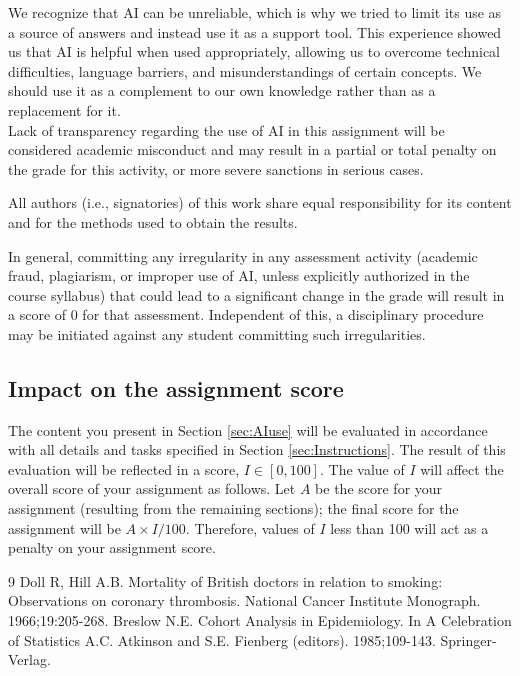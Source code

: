 \documentclass[10pt,a4paper,twoside]{article}\usepackage[]{graphicx}\usepackage[]{xcolor}
\begin{document}
We recognize that AI can be unreliable, which is why we tried to limit its use as a source of answers and instead use it as a support tool. This experience showed us that AI is helpful when used appropriately, allowing us to overcome technical difficulties, language barriers, and misunderstandings of certain concepts. We should use it as a complement to our own knowledge rather than as a replacement for it.
\[
\]
Lack of transparency regarding the use of AI in this assignment will be considered academic misconduct and may result in a partial or total penalty on the grade for this activity, or more severe sanctions in serious cases.

All authors (i.e., signatories) of this work share equal responsibility for its content and for the methods used to obtain the results. 

In general, committing any irregularity in any assessment activity (academic fraud, plagiarism, or improper use of AI, unless explicitly authorized in the course syllabus) that could lead to a significant change in the grade will result in a score of 0 for that assessment. Independent of this, a disciplinary procedure may be initiated against any student committing such irregularities.

\subsection{Impact on the assignment score}
The content you present in Section \ref{sec:AIuse} will be evaluated in accordance with all details and tasks specified in Section \ref{sec:Instructions}. The result of this evaluation will be reflected in a score,
$I \in [0, 100]$. The value of $I$ will affect the overall score of your assignment as follows. Let $A$ be the score for your assignment (resulting from the remaining sections); the final score for the assignment will be $A \times I/100$. Therefore, values of $I$ less than 100 will act as a
penalty on your assignment score.



\newpage
\begin{thebibliography}{9}
 Doll R, Hill A.B. Mortality of British doctors in relation to smoking: Observations on coronary thrombosis. National Cancer Institute Monograph. 1966;19:205-268.
 Breslow N.E. Cohort Analysis in Epidemiology. In A Celebration of Statistics A.C. Atkinson and S.E. Fienberg (editors). 1985;109-143. Springer-Verlag.
\end{thebibliography}
\end{document}
